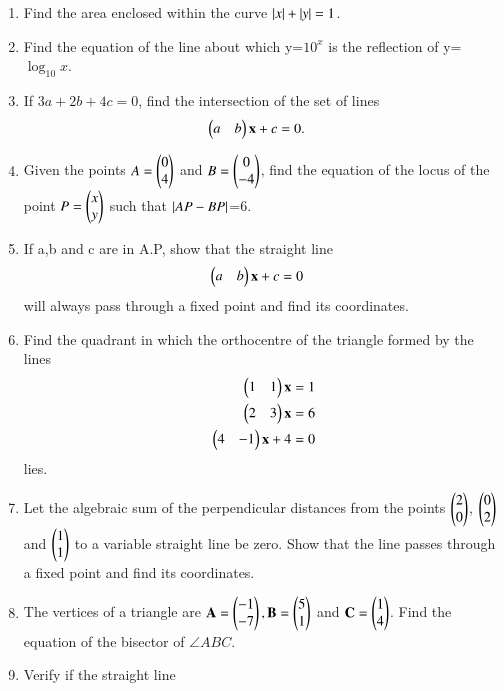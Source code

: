 \renewcommand{\theequation}{\theenumi}
\begin{enumerate}[label=\arabic*.,ref=\thesubsection.\theenumi]

    \item Find the area enclosed within the curve $\left\vert x\right\vert + \left\vert y\right\vert = 1 $.
    \item Find the equation of the line about which y=$10^x$ is the reflection of y=$\log_{10}x$.

    \item If $3a+2b+4c=0$, find the intersection of the  set of lines 
  \begin{align} 
    \begin{pmatrix}a & b\end{pmatrix}\mathbf{x} + c &= 0.
    \end{align}
    \item Given the points $A=\begin{pmatrix}0 \\ 4\end{pmatrix}$ and $B=\begin{pmatrix}0 \\ -4\end{pmatrix}$, find the equation of the locus of the point $P=\begin{pmatrix}x \\ y\end{pmatrix}$ such that $\left\vert AP-BP\right\vert $=6.
    \item If a,b and c are in A.P, show that  the straight line 
\begin{align} 
    \begin{pmatrix}a & b\end{pmatrix}\mathbf{x} + c &= 0
    \end{align}
will always pass through a fixed point and find its coordinates.
    \item Find the quadrant in which the orthocentre of the triangle formed by the lines 
\begin{align} 
    \begin{pmatrix}1 & 1\end{pmatrix}\mathbf{x}  &= 1
\\
    \begin{pmatrix}2 & 3\end{pmatrix}\mathbf{x}  &= 6
\\
    \begin{pmatrix}4 & -1\end{pmatrix}\mathbf{x} + 4 &= 0
    \end{align} lies.
    \item Let the algebraic sum of the perpendicular distances from the points $\begin{pmatrix}2 \\ 0\end{pmatrix}$,  $\begin{pmatrix}0 \\ 2\end{pmatrix}$ and $\begin{pmatrix}1 \\ 1\end{pmatrix}$ to a variable straight line be zero.  Show that  the line passes through a fixed point and find its  coordinates. 
    \item The vertices of a triangle are $\mathbf{A}=\begin{pmatrix}-1 \\ -7\end{pmatrix},\mathbf{B}=\begin{pmatrix}5 \\ 1\end{pmatrix}$ and $\mathbf{C}=\begin{pmatrix}1 \\ 4\end{pmatrix}$. Find the equation of the bisector of $\angle ABC$.
    \item Verify if the straight line 

\end{enumerate}
